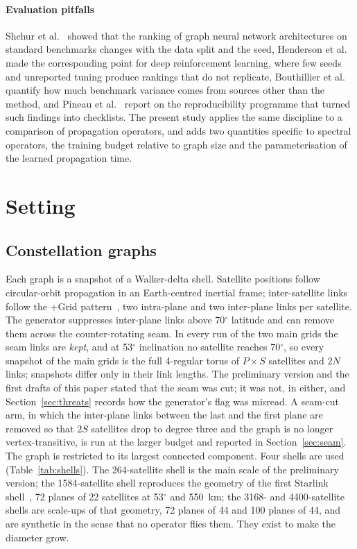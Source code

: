 \documentclass[preprint,11pt,3p]{elsarticle}
\begin{document}
\paragraph{Evaluation pitfalls}
Shchur et al.~\cite{shchur} showed that the ranking of graph neural network architectures on
standard benchmarks changes with the data split and the seed, Henderson et al.~\cite{henderson}
made the corresponding point for deep reinforcement learning, where few seeds and unreported
tuning produce rankings that do not replicate, Bouthillier et al.~\cite{bouthillier} quantify
how much benchmark variance comes from sources other than the method, and Pineau et
al.~\cite{pineau} report on the reproducibility programme that turned such findings into
checklists. The present study applies the same discipline
to a comparison of propagation operators, and adds two quantities specific to spectral
operators, the training budget relative to graph size and the parameterisation of the
learned propagation time.

\section{Setting}
\label{sec:setting}

\subsection{Constellation graphs}
\label{sec:graphs}

Each graph is a snapshot of a Walker-delta shell. Satellite positions follow circular-orbit
propagation in an Earth-centred inertial frame; inter-satellite links follow the +Grid
pattern~\cite{plusgrid}, two intra-plane and two inter-plane links per satellite. The generator
suppresses inter-plane links above 70$^{\circ}$ latitude and can remove them across the
counter-rotating seam. In every run of the two main grids the seam links are \emph{kept}, and at
53$^{\circ}$ inclination no satellite reaches 70$^{\circ}$, so every snapshot of the main grids is
the full 4-regular torus of $P\times S$ satellites and $2N$ links; snapshots differ only in their
link lengths. The preliminary version and the first drafts of this paper stated that the seam was
cut; it was not, in either, and Section~\ref{sec:threats} records how the generator's flag was
misread. A seam-cut arm, in which the inter-plane links between the last and the first plane are
removed so that $2S$ satellites drop to degree three and the graph is no longer vertex-transitive,
is run at the larger budget and reported in Section~\ref{sec:seam}. The graph is restricted to its
largest connected component. Four shells are used (Table~\ref{tab:shells}). The 264-satellite shell is the main scale of the preliminary
version; the 1584-satellite shell reproduces the geometry of the first Starlink
shell~\cite{starlink}, 72 planes of 22 satellites at 53$^{\circ}$ and 550~km; the 3168- and
4400-satellite shells are scale-ups of that geometry, 72 planes of 44 and 100 planes of 44,
and are synthetic in the sense that no operator flies them. They exist to make the diameter
grow.
\end{document}
